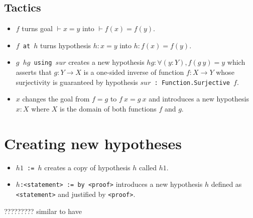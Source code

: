 \documentclass[a4paper]{article}
\begin{document}
\subsection*{Tactics}


\begin{itemize}
    \item \texttt{\applyfun $f$} turns goal $\vdash x = y$ into $\vdash f(x) = f(y)$.
    \item \texttt{\applyfun $f$ at $h$} turns hypothesis $h : x = y$ into $h : f(x) = f(y)$.
\end{itemize}


\begin{itemize}
    \item \texttt{\cchoose $g$ $hg$ using $sur$} creates a new hypothesis $hg : \forall (y : Y), f(g \ y) = y$ which asserts that $g : Y \to X$ is a one-sided inverse of function $f : X \to Y$ whose surjectivity is guaranteed by hypothesis \texttt{$sur$ : Function.Surjective $f$}.
\end{itemize}


\begin{itemize}
    \item \texttt{\ext $x$} changes the goal from $f = g$ to $f\ x = g\ x$ and introduces a new hypothesis $x : X$ where $X$ is the domain of both functions $f$ and $g$.
\end{itemize}

\section{Creating new hypotheses}


\begin{itemize}
    \item \texttt{\have $h1$ := $h$} creates a copy of hypothesis $h$ called $h1$.
    \item \texttt{\have $h$:<statement> := by <proof>} introduces a new hypothesis $h$ defined as \texttt{<statement>} and justified by \texttt{<proof>}.
\end{itemize}

 ????????? similar to have

\end{document}
